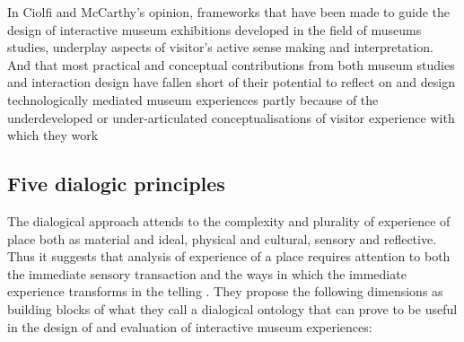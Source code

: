 In Ciolfi and McCarthy’s opinion, frameworks that have been made to guide the design of interactive museum exhibitions developed in the field of museums studies, underplay aspects of visitor’s active sense making and interpretation. And that most practical and conceptual contributions from both museum studies and interaction design have fallen short of their potential to reflect on and design technologically mediated museum experiences partly because of the underdeveloped or under-articulated conceptualisations of visitor experience with which they work \autocite[p. 248]{mccarthy_place}



\subsection{Five dialogic principles}
The dialogical approach attends to the complexity and plurality of experience of place both as material and ideal, physical and cultural, sensory and reflective. Thus it suggests that analysis of experience of a place requires attention to both the immediate sensory transaction and the ways in which the immediate experience transforms in the telling \autocite[p. 251]{mccarthy_place}. They propose the following dimensions as building blocks of what they call a dialogical ontology that can prove to be useful in the design of and evaluation of interactive museum experiences:

